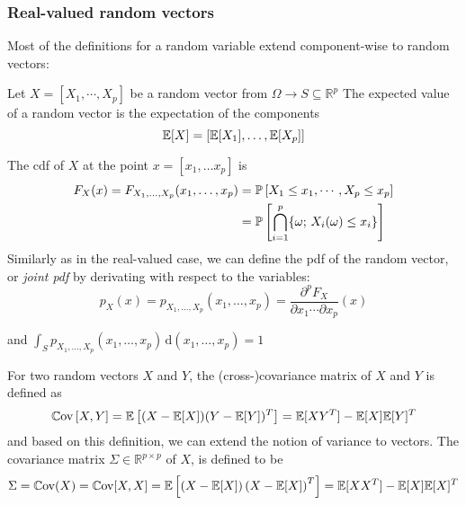 \documentclass[../../Main_ManuscritThese.tex]{subfiles}
\begin{document}
\subsubsection{Real-valued random vectors}
 Most of the definitions for a random variable extend component-wise to random vectors:

\begin{definition}
 \label{def:joint_marginal_cond_densities}
 Let $X=[X_1,\cdots,X_p]$ be a random vector from $\Omega \rightarrow S\subseteq\mathbb{R}^p$
 The expected value of a random vector is the expectation of the components
 \begin{equation}
\mathbb{E}[X] = \left[\mathbb{E}[X_1],\dots,\mathbb{E}[X_p]\right]
\end{equation}

The cdf of $X$ at the point $x=[x_1,\dots x_p]$ is
   \begin{align}
     \label{eq:def_cdf_multi}
     F_{X}(x) = F_{X_1,\dots, X_p}(x_1,\dots, x_p) &= \mathbb{P}\left[X_1 \leq x_1, \cdots, X_p\leq x_p\right]\\
                                                   &= \mathbb{P}\left[\bigcap_{i=1}^p \{\omega;\,X_i(\omega) \leq x_i\}\right] \nonumber
  \end{align}
  Similarly as in the real-valued case, we can define the pdf of the
  random vector, or \emph{joint pdf} by derivating with respect to the
  variables:
  \begin{equation}
    p_{X}(x)= p_{X_1,\dots, X_p}(x_1,\dots, x_p) =\frac{\partial^p F_X}{\partial x_1 \cdots \partial x_p}(x)
  \end{equation}
  
  and $\int_{S}p_{X_1,\dots, X_p}(x_1,\dots, x_p)\,\mathrm{d}(x_1,\dots, x_p)=1$

For two random vectors $X$ and $Y$, the (cross-)covariance matrix of $X$ and $Y$ is defined as  
  \begin{equation}
    \mathbb{C}\mathrm{ov}\left[X,Y\right] = \mathbb{E}\left[(X-\mathbb{E}[X])(Y - \mathbb{E}[Y])^T\right] = \mathbb{E}[XY^T] - \mathbb{E}[X]\mathbb{E}[Y]^T
  \end{equation}
and based on this definition, we can extend the notion of variance to vectors. The covariance matrix $\Sigma \in \mathbb{R}^{p\times p}$ of $X$, is defined to be
  \begin{equation}
    \Sigma = \mathbb{C}\mathrm{ov}(X)=\mathbb{C}\mathrm{ov}[X,X]= \mathbb{E}\left[\left(X - \mathbb{E}[X]\right)\left(X-\mathbb{E}[X]\right)^T\right] = \mathbb{E}[XX^T] - \mathbb{E}[X]\mathbb{E}[X]^T
  \end{equation}



\end{definition}
\end{document}
